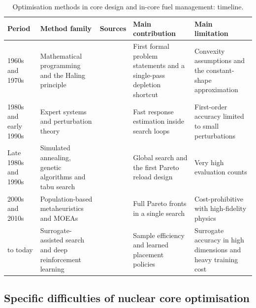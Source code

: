 \begin{table}[htbp]
  \centering
  \caption{Optimisation methods in core design and in-core fuel management: timeline.}
  \label{tab:lit-opt-timeline}
  \footnotesize
  \begin{tabular}{@{}>{\raggedright\arraybackslash}p{}>{\raggedright\arraybackslash}p{}%
                  >{\raggedright\arraybackslash}p{}>{\raggedright\arraybackslash}p{}>{\raggedright\arraybackslash}p{}@{}}
    \toprule
    Period & Method family & Sources & Main contribution &
    Main limitation \\
    \midrule
    1960s and 1970s &
    Mathematical programming and the Haling principle &
    \cite{meneses_2010,downar_1988} &
    First formal problem statements and a single-pass depletion
    shortcut &
    Convexity assumptions and the constant-shape approximation \\
    \addlinespace
    1980s and early 1990s &
    Expert systems and perturbation theory &
    \cite{hobson_turinsky_1986,meneses_2010,rozon_beaudet_1992} &
    Fast response estimation inside search loops &
    First-order accuracy limited to small perturbations \\
    \addlinespace
    Late 1980s and 1990s &
    Simulated annealing, genetic algorithms and tabu search &
    \cite{kropaczek_turinsky_1991,maldonado_1995,parks_1996,meneses_2010} &
    Global search and the first Pareto reload design &
    Very high evaluation counts \\
    \addlinespace
    2000s and 2010s &
    Population-based metaheuristics and MOEAs &
    \cite{deb_nsga2_2002} &
    Full Pareto fronts in a single search &
    Cost-prohibitive with high-fidelity physics \\
    \addlinespace
    2019 to today &
    Surrogate-assisted search and deep reinforcement learning &
    \cite{whyte_2020,seurin_2024_pearl} &
    Sample efficiency and learned placement policies &
    Surrogate accuracy in high dimensions and heavy training cost \\
    \bottomrule
  \end{tabular}
\end{table}

\subsection{Specific difficulties of nuclear core optimisation}
\label{sec:lit-opt-difficulties}

